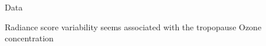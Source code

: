 \documentclass[final]{beamer}
\begin{document}
\begin{frame}[t]
{\begin{minipage}[t][76cm][t]{58cm}
{\begin{minipage}[t][50cm][t]{58cm}
\begin{block}{Data}
            \begin{center}
              Radiance score variability seems associated with the tropopause Ozone
              concentration
            \end{center}
          \end{block}
        \end{minipage}
      }
    \end{minipage}%
  }
  \colorbox{blue!0}{
    \begin{minipage}[t][76cm][t]{58cm}


\end{minipage}}
\end{frame}
\end{document}
